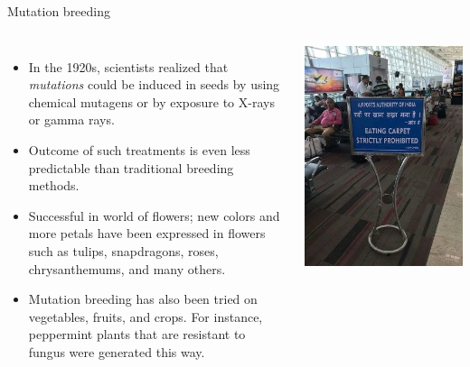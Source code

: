\documentclass[
  ignorenonframetext,
  aspectratio=169]{beamer}
\providecommand{\tightlist}{%
  \setlength{\itemsep}{0pt}\setlength{\parskip}{0pt}}
\newcommand{\bcolumns}{\begin{columns}[T, onlytextwidth]}
\newcommand{\ecolumns}{\end{columns}}
\begin{document}
\begin{frame}{Mutation breeding}
\protect\hypertarget{mutation-breeding}{}
\bcolumns
{}

\begin{itemize}
\tightlist
\item
  In the 1920s, scientists realized that \emph{mutations} could be
  induced in seeds by using chemical mutagens or by exposure to X-rays
  or gamma rays.
\item
  Outcome of such treatments is even less predictable than traditional
  breeding methods.
\item
  Successful in world of flowers; new colors and more petals have been
  expressed in flowers such as tulips, snapdragons, roses,
  chrysanthemums, and many others.
\item
  Mutation breeding has also been tried on vegetables, fruits, and
  crops. For instance, peppermint plants that are resistant to fungus
  were generated this way.
\end{itemize}


\begin{center}\includegraphics[width=0.9\linewidth]{../images/missense_mutation_base_deletion} \end{center}

\ecolumns
\end{frame}
\end{document}
